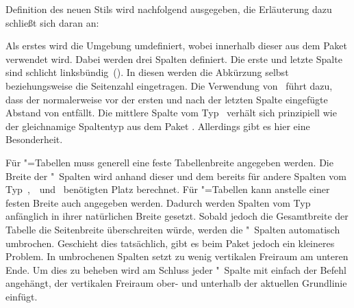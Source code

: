 \documentclass[%
  english,ngerman,%
  geometry=no,DIV=12,automark,%
]{tudscrartcl}
\begin{document}
Definition des neuen Stils  wird nachfolgend ausgegeben, 
die Erläuterung dazu schließt sich daran an:
%
\InputHook{\let\newglossarystyle\renewglossarystyle}
\begin{Excerpt}
\end{Excerpt}
%
Als erstes wird die Umgebung  umdefiniert, wobei 
innerhalb dieser  aus dem Paket  verwendet 
wird. Dabei werden drei Spalten definiert. Die erste und letzte Spalte sind 
schlicht linksbündig~(). In diesen werden die Abkürzung selbst 
beziehungsweise die Seitenzahl eingetragen. Die Verwendung von~ 
führt dazu, dass der normalerweise vor der ersten und nach der letzten Spalte 
eingefügte Abstand von  entfällt. Die mittlere Spalte vom 
Typ~ verhält sich prinzipiell wie der gleichnamige Spaltentyp aus dem 
Paket . Allerdings gibt es hier eine Besonderheit.

Für "=Tabellen muss generell eine feste Tabellenbreite 
angegeben werden. Die Breite der "~Spalten wird anhand dieser und 
dem bereits für andere Spalten vom Typ~,~~und~ 
benötigten Platz berechnet. Für "=Tabellen kann anstelle 
einer festen Breite auch  angegeben werden. Dadurch werden 
Spalten vom Typ~ anfänglich in ihrer natürlichen Breite gesetzt. 
Sobald jedoch die Gesamtbreite der Tabelle die Seitenbreite überschreiten 
würde, werden die "~Spalten automatisch umbrochen. Geschieht dies 
tatsächlich, gibt es beim Paket  jedoch ein kleineres Problem. 
In umbrochenen Spalten setzt  zu wenig vertikalen Freiraum am 
unteren Ende. Um dies zu beheben wird am Schluss jeder "~Spalte mit
 einfach der Befehl  angehängt, der 
vertikalen Freiraum ober- und unterhalb der aktuellen Grundlinie einfügt.
\end{document}
